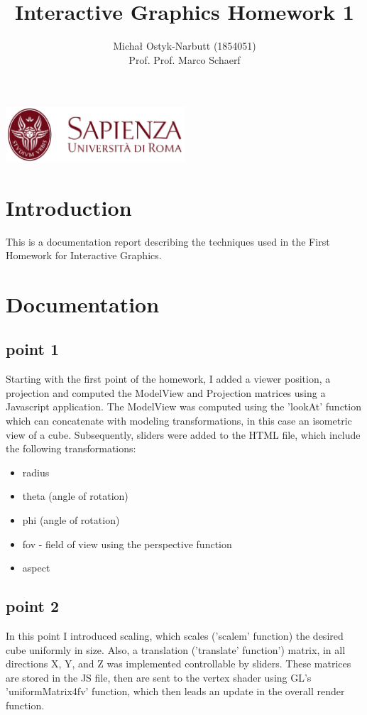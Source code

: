 \documentclass[12pt,a4paper]{article}
\begin{document}
\title{Interactive Graphics Homework 1}
\author{Michał Ostyk-Narbutt (1854051)\\Prof. Prof. Marco Schaerf }

\maketitle


\begin{center}
\includegraphics[width=0.5\textwidth]{img/sapienza_logo.jpg}
\end{center}
\maketitle
\tableofcontents
\clearpage
\section{Introduction}
This is a documentation report describing the techniques used in the First Homework for Interactive Graphics.
\section{Documentation}
\subsection{point 1}
Starting with the first point of the homework, I added a viewer position, a projection and computed the ModelView and Projection matrices using a Javascript application. The ModelView was computed using the 'lookAt' function which can concatenate with modeling transformations, in this case an isometric view of a cube. Subsequently, sliders were added to the HTML file, which include the following transformations: 
\begin{itemize}
\item radius
\item theta (angle of rotation)
\item phi (angle of rotation)
\item fov - field of view using the perspective function
\item aspect
\end{itemize}
\subsection{point 2}
In this point I introduced scaling, which scales ('scalem' function) the desired cube uniformly in size. Also, a translation ('translate' function') matrix, in all directions X, Y, and Z was implemented controllable by sliders. These matrices are stored in the JS file, then are sent to the vertex shader using GL's 'uniformMatrix4fv' function, which then leads an update in the overall render function.
\end{document}
